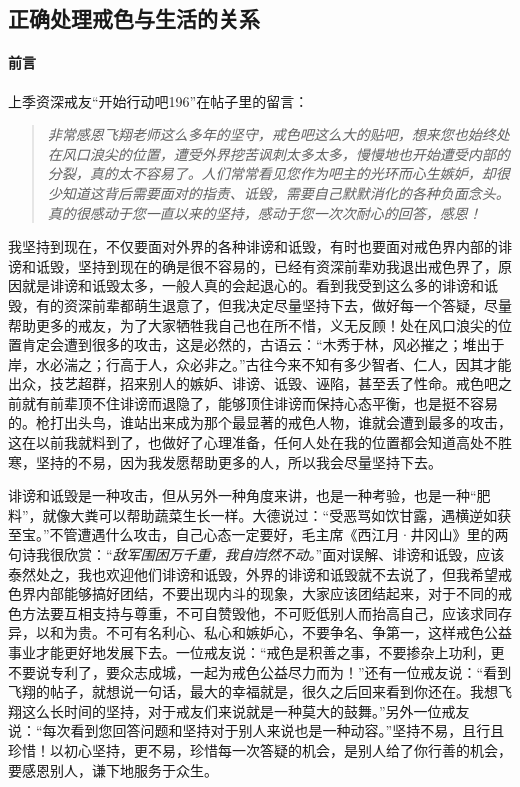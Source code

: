 \subsection{正确处理戒色与生活的关系}

\paragraph*{前言}

上季资深戒友“开始行动吧196”在帖子里的留言：

\begin{quote}\it
    非常感恩飞翔老师这么多年的坚守，戒色吧这么大的贴吧，想来您也始终处在风口浪尖的位置，遭受外界挖苦讽刺太多太多，慢慢地也开始遭受内部的分裂，真的太不容易了。人们常常看见您作为吧主的光环而心生嫉妒，却很少知道这背后需要面对的指责、诋毁，需要自己默默消化的各种负面念头。真的很感动于您一直以来的坚持，感动于您一次次耐心的回答，感恩！
\end{quote}

我坚持到现在，不仅要面对外界的各种诽谤和诋毁，有时也要面对戒色界内部的诽谤和诋毁，坚持到现在的确是很不容易的，已经有资深前辈劝我退出戒色界了，原因就是诽谤和诋毁太多，一般人真的会起退心的。看到我受到这么多的诽谤和诋毁，有的资深前辈都萌生退意了，但我决定尽量坚持下去，做好每一个答疑，尽量帮助更多的戒友，为了大家牺牲我自己也在所不惜，义无反顾！处在风口浪尖的位置肯定会遭到很多的攻击，这是必然的，古语云：“木秀于林，风必摧之；堆出于岸，水必湍之；行高于人，众必非之。”古往今来不知有多少智者、仁人，因其才能出众，技艺超群，招来别人的嫉妒、诽谤、诋毁、诬陷，甚至丢了性命。戒色吧之前就有前辈顶不住诽谤而退隐了，能够顶住诽谤而保持心态平衡，也是挺不容易的。枪打出头鸟，谁站出来成为那个最显著的戒色人物，谁就会遭到最多的攻击，这在以前我就料到了，也做好了心理准备，任何人处在我的位置都会知道高处不胜寒，坚持的不易，因为我发愿帮助更多的人，所以我会尽量坚持下去。

诽谤和诋毁是一种攻击，但从另外一种角度来讲，也是一种考验，也是一种“肥料”，就像大粪可以帮助蔬菜生长一样。大德说过：“受恶骂如饮甘露，遇横逆如获至宝。”不管遭遇什么攻击，自己心态一定要好，毛主席《西江月·井冈山》里的两句诗我很欣赏：“\textit{敌军围困万千重，我自岿然不动。}”面对误解、诽谤和诋毁，应该泰然处之，我也欢迎他们诽谤和诋毁，外界的诽谤和诋毁就不去说了，但我希望戒色界内部能够搞好团结，不要出现内斗的现象，大家应该团结起来，对于不同的戒色方法要互相支持与尊重，不可自赞毁他，不可贬低别人而抬高自己，应该求同存异，以和为贵。不可有名利心、私心和嫉妒心，不要争名、争第一，这样戒色公益事业才能更好地发展下去。一位戒友说：“戒色是积善之事，不要掺杂上功利，更不要说专利了，要众志成城，一起为戒色公益尽力而为！”还有一位戒友说：“看到飞翔的帖子，就想说一句话，最大的幸福就是，很久之后回来看到你还在。我想飞翔这么长时间的坚持，对于戒友们来说就是一种莫大的鼓舞。”另外一位戒友说：“每次看到您回答问题和坚持对于别人来说也是一种动容。”坚持不易，且行且珍惜！以初心坚持，更不易，珍惜每一次答疑的机会，是别人给了你行善的机会，要感恩别人，谦下地服务于众生。

